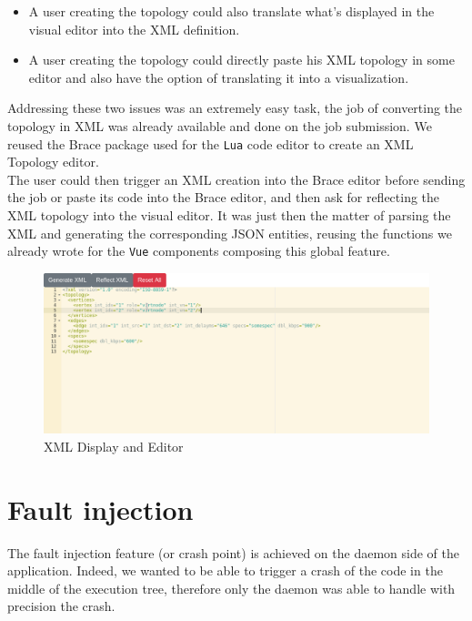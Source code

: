 \documentclass{eplmastersthesis}
\begin{document}
        \begin{itemize}
          \item A user creating the topology could also translate what's
          displayed in the visual editor into the XML definition.
          \item A user creating the topology could directly paste
          his XML topology in some editor and also have the option of
          translating it into a visualization.
        \end{itemize}

        Addressing these two issues was an extremely easy task, the job of
        converting the topology in XML was already available and done on
        the job submission. We reused the Brace package used
        for the \texttt{Lua} code editor to create an XML Topology editor.\\
        The user could then trigger an XML creation into the Brace editor
        before sending the job or paste its code into the Brace editor, and
        then ask for reflecting the XML topology into the visual editor. It
        was just then the matter of parsing the XML and generating the
        corresponding JSON entities, reusing the functions we already wrote
        for the \texttt{Vue} components composing this global feature.

        \begin{figure}[H]
          \centering
          \includegraphics[scale=0.5]{figures/xml_topology.png}
          \caption{\label{xml_topology} XML Display and Editor}
        \end{figure}

    \section{Fault injection}

      The fault injection feature (or crash point) is achieved on the daemon
      side of the application. Indeed, we wanted to be able to trigger a crash
      of the code in the middle of the execution tree, therefore only the
      daemon was able to handle with precision the crash.\\
\end{document}
